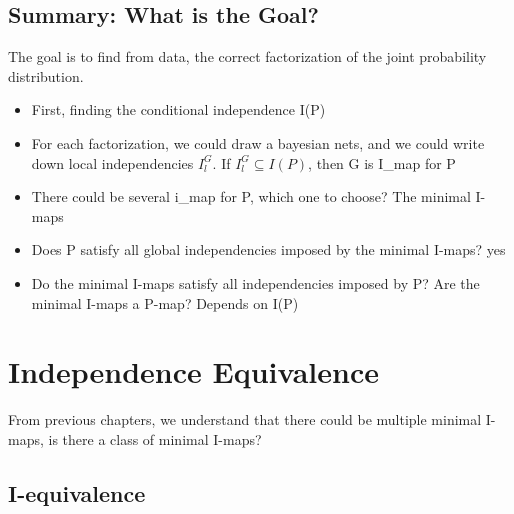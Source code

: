 \documentclass[11pt,a4paper]{report}
\begin{document}
\section{Summary: What is the Goal?}

The goal is to find from data, the correct factorization of the joint probability distribution. 

\begin{itemize}
    \item First, finding the conditional independence I(P)
    \item For each factorization, we could draw a bayesian nets, and we could write down local independencies $I_{l}^{G}$. If $I_{l}^{G} \subseteq I(P)$, then G is I\_map for P
    \item There could be several i\_map for P, which one to choose? The minimal I-maps
    \item Does P satisfy all global independencies imposed by the minimal I-maps? yes
    \item Do the minimal I-maps satisfy all independencies imposed by P? Are the minimal I-maps a P-map? Depends on I(P)
\end{itemize}

\chapter{Independence Equivalence}

From previous chapters, we understand that there could be multiple minimal I-maps, is there a class of minimal I-maps?

\section{I-equivalence}
\end{document}
